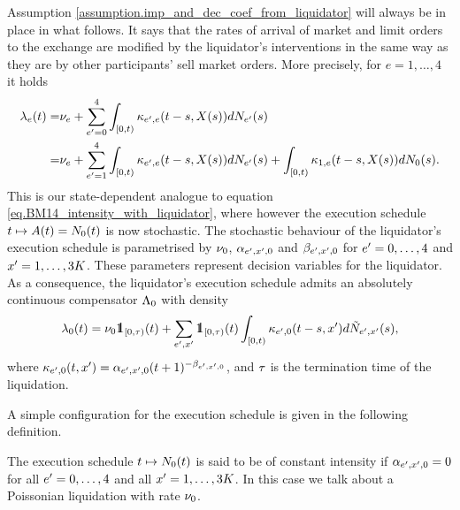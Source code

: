 \documentclass[10pt, article,table]{article}
\begin{document}
Assumption \ref{assumption.imp_and_dec_coef_from_liquidator} will always be in place in what follows. It says that the rates of arrival of market and limit orders to the exchange are modified by the liquidator's interventions in the same way as they are by other participants' sell market orders. More precisely, for $e=1,\dots,4$ it holds 
\begin{equation}\label{eq.intensities_when_liquidator_is_present}
\begin{split}
\intensity[e](t) =& \baseRate_e 
 + \sum_{\eone = 0}^{4}\int_{[0,t)} \hawkesKernel_{\eone,e}(t-s,\stateVariable(s))d\countingProc[\eone](s)
 \\
 =& \baseRate_e 
 + \sum_{\eone = 1}^{4}\int_{[0,t)} \hawkesKernel_{\eone,e}(t-s,\stateVariable(s))d\countingProc[\eone](s)
 + \int_{[0,t)} \hawkesKernel_{1,e}(t-s,\stateVariable(s))d\countingProc[0](s).
 \end{split}
\end{equation}
This is our state-dependent analogue to equation \eqref{eq.BM14_intensity_with_liquidator}, where however the execution schedule $t \mapsto A(t)=\countingProc[0](t)$ is now stochastic. The stochastic behaviour of the liquidator's execution schedule is parametrised by $\baseRate_0$, $\impCoef_{\eone,\xone,0}$ and $\decCoef_{\eone,\xone,0}$ for $\eone = 0,\dots,4$ and $\xone=1,\dots,3K$. These parameters represent decision variables for the liquidator. As a consequence, the liquidator's execution schedule admits an absolutely continuous compensator $\compensator_{0}$ with density 
\begin{equation}\label{eq.intensity_of_liquidator}
 \intensity[0](t)
 =
 \baseRate_0 \one_{[0,\terminationTime)}(t) + 
 \sum_{\eone,\xone}\one_{[0,\terminationTime)}(t)
 \int_{[0,t)} \hawkesKernel_{\eone,0} (t-s,\xone) d\hybridHawkes_{\eone,\xone}(s),
\end{equation}
where $\hawkesKernel_{\eone,0}(t,\xone) = \impCoef_{\eone,\xone,0}(t+1)^{-\decCoef_{\eone,\xone,0}}$, and $\terminationTime$ is the termination time of the liquidation. 

A simple configuration for the execution schedule is given in the following definition. 
\begin{defi}\label{def.poissonina_liquidation}
The execution schedule $t \mapsto \countingProc[0](t)$ is said to be of constant intensity if $\impCoef_{\eone,\xone,0} = 0$ for all $\eone = 0,\dots,4$ and all $\xone=1,\dots,3K$. In this case we talk about a Poissonian liquidation with rate $\baseRate_0$. 
\end{defi}
\end{document}
